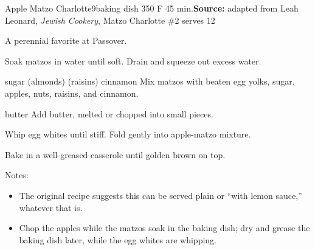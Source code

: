 \begin{recipe}{Apple Matzo Charlotte}{9\inch{}\inch baking dish \hfill 350\0 F \hfill 45 min.}{\textbf{Source:} adapted from Leah Leonard, \textit{Jewish Cookery}, Matzo Charlotte \#2 \hfill serves 12}

 \freeform A perennial favorite at Passover.

 Soak matzos in water until soft. Drain and squeeze out excess water.

  {sugar}
  {(almonds)}
  {(raisins)}
  {cinnamon}
 Mix matzos with beaten egg yolks, sugar, apples, nuts, raisins, and cinnamon.

  {butter}
 Add butter, melted or chopped into small pieces.

 Whip egg whites until stiff. Fold gently into apple-matzo mixture.

 \newstep Bake in a well-greased casserole until golden brown on top.

 \freeform Notes:
 \begin{itemize}
  \item The original recipe suggests this can be served plain or ``with lemon sauce,'' whatever that is.
  \item Chop the apples while the matzos soak in the baking dish; dry and grease the baking dish later, while the egg whites are whipping.
 \end{itemize}
\end{recipe}
